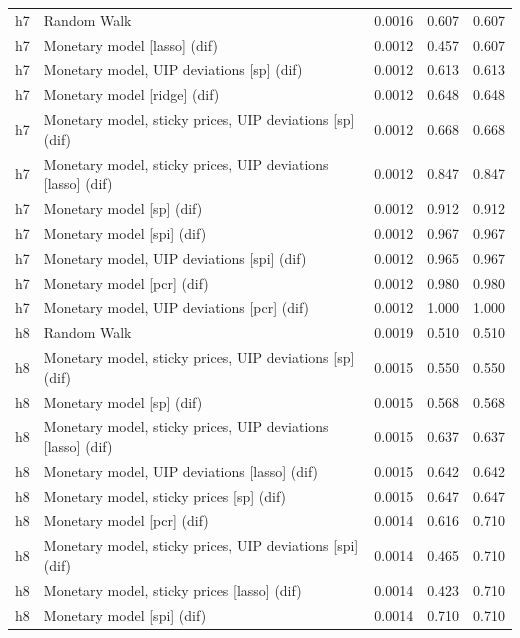\begin{ThreePartTable}
\begin{longtable}[t]{cp{5.5cm}ccc}
\addlinespace
h7 & \raggedright Random Walk & 0.0016 & 0.607 & 0.607\\
h7 & \raggedright Monetary model [lasso] (dif) & 0.0012 & 0.457 & 0.607\\
h7 & \raggedright Monetary model, UIP deviations [sp] (dif) & 0.0012 & 0.613 & 0.613\\
h7 & \raggedright Monetary model [ridge] (dif) & 0.0012 & 0.648 & 0.648\\
h7 & \raggedright Monetary model, sticky prices, UIP deviations [sp] (dif) & 0.0012 & 0.668 & 0.668\\
h7 & \raggedright Monetary model, sticky prices, UIP deviations [lasso] (dif) & 0.0012 & 0.847 & 0.847\\
h7 & \raggedright Monetary model [sp] (dif) & 0.0012 & 0.912 & 0.912\\
h7 & \raggedright Monetary model [spi] (dif) & 0.0012 & 0.967 & 0.967\\
h7 & \raggedright Monetary model, UIP deviations [spi] (dif) & 0.0012 & 0.965 & 0.967\\
h7 & \raggedright Monetary model [pcr] (dif) & 0.0012 & 0.980 & 0.980\\
h7 & \raggedright Monetary model, UIP deviations [pcr] (dif) & 0.0012 & 1.000 & 1.000\\
\addlinespace
h8 & \raggedright Random Walk & 0.0019 & 0.510 & 0.510\\
h8 & \raggedright Monetary model, sticky prices, UIP deviations [sp] (dif) & 0.0015 & 0.550 & 0.550\\
h8 & \raggedright Monetary model [sp] (dif) & 0.0015 & 0.568 & 0.568\\
h8 & \raggedright Monetary model, sticky prices, UIP deviations [lasso] (dif) & 0.0015 & 0.637 & 0.637\\
h8 & \raggedright Monetary model, UIP deviations [lasso] (dif) & 0.0015 & 0.642 & 0.642\\
h8 & \raggedright Monetary model, sticky prices [sp] (dif) & 0.0015 & 0.647 & 0.647\\
h8 & \raggedright Monetary model [pcr] (dif) & 0.0014 & 0.616 & 0.710\\
h8 & \raggedright Monetary model, sticky prices, UIP deviations [spi] (dif) & 0.0014 & 0.465 & 0.710\\
h8 & \raggedright Monetary model, sticky prices [lasso] (dif) & 0.0014 & 0.423 & 0.710\\
h8 & \raggedright Monetary model [spi] (dif) & 0.0014 & 0.710 & 0.710\\

\end{longtable}
\end{ThreePartTable}
